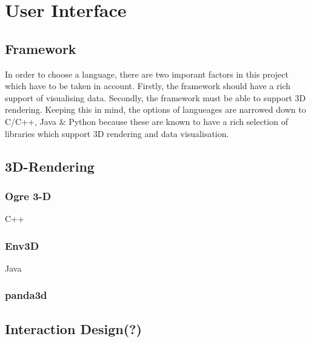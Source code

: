 \section{User Interface}
\subsection{Framework}
In order to choose a language, there are two imporant factors in this project which have to be taken in account. Firstly, the framework should have a rich support of visualising data. Secondly, the framework must be able to support 3D rendering. Keeping this in mind, the options of langueages are narrowed down to C/C++, Java \& Python because these are known to have a rich selection of libraries which support 3D rendering and data visualisation. 
\subsection{3D-Rendering}

\subsubsection{Ogre 3-D}
C++
\subsubsection{Env3D}
Java
\subsubsection{panda3d}



\subsection{Interaction Design(?)}